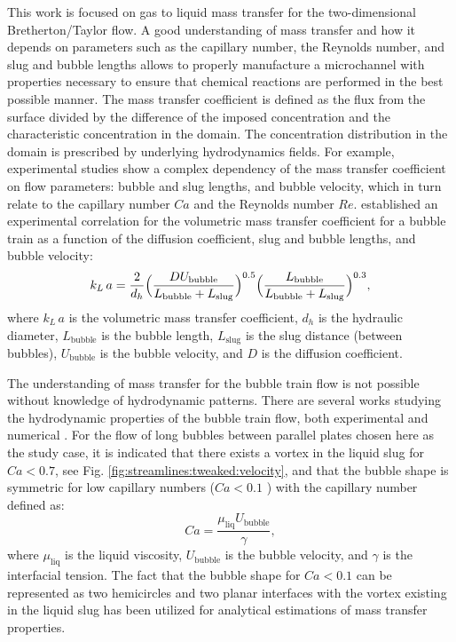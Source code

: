 \documentclass{article}
\newcommand{\beq}{\begin{equation}}
\newcommand{\feq}{\end{equation}}
\newcommand{\vol}{k_L\,a}
\newcommand{\lbubble}{L_{\mathrm{bubble}}}
\newcommand{\lslug}{L_{\mathrm{slug}}}
\newcommand{\ububble}{U_{\mathrm{bubble}}}
\begin{document}
This work is focused on  gas to liquid mass transfer  for the two-dimensional Bretherton/Taylor flow. A good understanding of mass transfer and how it depends on 
parameters such as the capillary number, the Reynolds number, and slug and bubble lengths allows to properly
manufacture a microchannel with properties necessary to ensure that chemical
reactions are performed in the best possible manner. The mass transfer coefficient is defined as the flux from the 
surface divided by the difference of the imposed concentration and the characteristic concentration in the domain.
 The  concentration distribution in the domain is prescribed by underlying hydrodynamics fields. 
 For example, experimental studies \cite{yue-mass,bercic-mass} show a complex dependency of the mass transfer coefficient on flow parameters:
 bubble and slug lengths, and bubble velocity, which  in turn relate to the capillary number $Ca$ and the Reynolds number $Re$. 
\citet{yue-mass} established an experimental correlation for the volumetric mass transfer coefficient for a bubble train as
a function of the diffusion coefficient, slug and bubble lengths, and bubble velocity: 
\begin{equation}
\vol =\frac{2}{d_h} \Bigl(\frac{D
\ububble}{\lbubble+\lslug}\Bigr)^{0.5}
\Bigl(\frac{\lbubble}{\lbubble+\lslug}\Bigr)^{0.3},
\end{equation}
where $\vol$ is the volumetric mass transfer coefficient, $d_h$ is the hydraulic
diameter, $\lbubble$ is the bubble length, $\lslug$ is the slug distance (between bubbles),
$\ububble$ is the bubble velocity, and $D$ is the diffusion coefficient. 

The understanding of mass transfer for the bubble train flow is not possible without knowledge of hydrodynamic patterns.
There are several works studying the hydrodynamic properties of the bubble train flow, both
experimental \cite{kreutzer-pressure-drop,cerro-space,cerro-bubble-train} and numerical \cite{wang-non-circular,kuzmin-binary3d,giavedoni-numerical,heil-threedim}.
 For the flow of long bubbles between parallel plates chosen here as the study case, it is indicated that  there exists a vortex 
in the liquid slug for $Ca<0.7$, see Fig. \ref{fig:streamlines:tweaked:velocity}, and that the bubble shape is symmetric for low capillary 
numbers ($Ca<0.1$ \cite{cerro-bubble-train}) with the capillary number defined as:
 \beq
 Ca=\frac{\mu_{\mathrm{liq}} \ububble}{\gamma},
 \feq
 where $\mu_{\mathrm{liq}}$ is the liquid viscosity, $\ububble$ is the bubble velocity, and $\gamma$ is the interfacial tension.
 The fact that the bubble shape for $Ca<0.1$ can be represented as two hemicircles and two planar interfaces with the vortex existing in the liquid slug has been 
utilized for analytical estimations of mass transfer properties.
\end{document}
